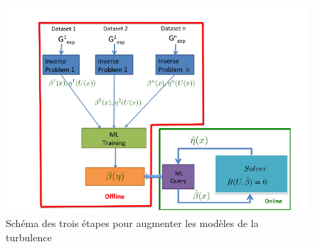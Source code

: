 \documentclass[a4paper,12pt]{report}
\numberwithin{equation}{section} %
\begin{document}
\begin{figure}[!ht]
\centering
\includegraphics[scale=0.8 ]{singh.png}
\caption{Schéma des trois étapes pour augmenter les modèles de la turbulence}
\label{singh}
\end{figure}
\end{document}
